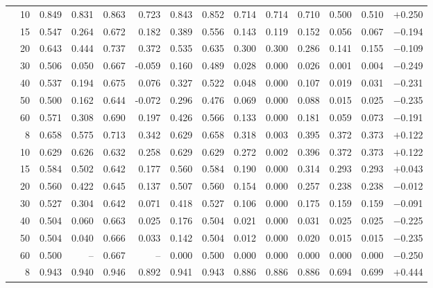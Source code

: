 \documentclass[conference]{IEEEtran}
\theoremstyle{remark}
\begin{document}
\begin{table}[ht]
{\begin{tabular}{p{1.55cm}r rrrr rr rr rrr r}
  & 10 & 0.849 & 0.831 & 0.863 & 0.723 & 0.843 & 0.852 & 0.714 & 0.714 & 0.710 & 0.500 & 0.510 & $+$0.250 \\
  & 15 & 0.547 & 0.264 & 0.672 & 0.182 & 0.389 & 0.556 & 0.143 & 0.119 & 0.152 & 0.056 & 0.067 & $-$0.194 \\
  & 20 & 0.643 & 0.444 & 0.737 & 0.372 & 0.535 & 0.635 & 0.300 & 0.300 & 0.286 & 0.141 & 0.155 & $-$0.109 \\
  & 30 & 0.506 & 0.050 & 0.667 & -0.059 & 0.160 & 0.489 & 0.028 & 0.000 & 0.026 & 0.001 & 0.004 & $-$0.249 \\
  & 40 & 0.537 & 0.194 & 0.675 & 0.076 & 0.327 & 0.522 & 0.048 & 0.000 & 0.107 & 0.019 & 0.031 & $-$0.231 \\
  & 50 & 0.500 & 0.162 & 0.644 & -0.072 & 0.296 & 0.476 & 0.069 & 0.000 & 0.088 & 0.015 & 0.025 & $-$0.235 \\
  & 60 & 0.571 & 0.308 & 0.690 & 0.197 & 0.426 & 0.566 & 0.133 & 0.000 & 0.181 & 0.059 & 0.073 & $-$0.191 \\
\midrule
{}
  & 8 & 0.658 & 0.575 & 0.713 & 0.342 & 0.629 & 0.658 & 0.318 & 0.003 & 0.395 & 0.372 & 0.373 & $+$0.122 \\
  & 10 & 0.629 & 0.626 & 0.632 & 0.258 & 0.629 & 0.629 & 0.272 & 0.002 & 0.396 & 0.372 & 0.373 & $+$0.122 \\
  & 15 & 0.584 & 0.502 & 0.642 & 0.177 & 0.560 & 0.584 & 0.190 & 0.000 & 0.314 & 0.293 & 0.293 & $+$0.043 \\
  & 20 & 0.560 & 0.422 & 0.645 & 0.137 & 0.507 & 0.560 & 0.154 & 0.000 & 0.257 & 0.238 & 0.238 & $-$0.012 \\
  & 30 & 0.527 & 0.304 & 0.642 & 0.071 & 0.418 & 0.527 & 0.106 & 0.000 & 0.175 & 0.159 & 0.159 & $-$0.091 \\
  & 40 & 0.504 & 0.060 & 0.663 & 0.025 & 0.176 & 0.504 & 0.021 & 0.000 & 0.031 & 0.025 & 0.025 & $-$0.225 \\
  & 50 & 0.504 & 0.040 & 0.666 & 0.033 & 0.142 & 0.504 & 0.012 & 0.000 & 0.020 & 0.015 & 0.015 & $-$0.235 \\
  & 60 & 0.500 & -- & 0.667 & -- & 0.000 & 0.500 & 0.000 & 0.000 & 0.000 & 0.000 & 0.000 & $-$0.250 \\
\midrule
{}
  & 8 & 0.943 & 0.940 & 0.946 & 0.892 & 0.941 & 0.943 & 0.886 & 0.886 & 0.886 & 0.694 & 0.699 & $+$0.444 \\

\end{tabular}}
\end{table}
\end{document}
